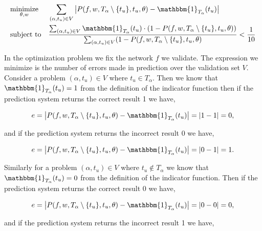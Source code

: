 \begin{equation}
    \label{eq:prediction_system_minimization}
    \begin{aligned}
        & \underset{\theta, w}{\text{minimize}}
        & & \sum_{(\alpha, t_u) \in V} \left|
            P(f, w, T_\alpha \setminus \{t_u\}, t_u, \theta) -
            \mathbbm{1}_{T_\alpha}(t_u)
        \right| \\
        & \text{subject to}
        & & \frac{\sum_{(\alpha, t_u) \in V} \mathbbm{1}_{T_\alpha}(t_u) \cdot
            \left(1 - P(f, w, T_\alpha \setminus \{t_u\}, t_u, \theta)\right)}
{\sum_{(\alpha, t_u) \in V} (1 - P(f, w, T_\alpha \setminus \{t_u\}, t_u, \theta)} <
            \frac{1}{10}
    \end{aligned}
\end{equation}

In the optimization problem we fix the network $f$ we validate. The expression
we minimize is the number of errors made in prediction over the validation set
$V$. Consider a problem $(\alpha, t_u) \in V$ where $t_u \in T_\alpha$. Then we
know that $\mathbbm{1}_{T_\alpha}(t_u) = 1$ from the definition of the indicator
function then if the prediction system returns the correct result 1 we have,

\begin{equation}
    e = \left|
        P(f, w, T_\alpha \setminus \{t_u\}, t_u, \theta) -
        \mathbbm{1}_{T_\alpha}(t_u)
    \right| = |1 - 1| = 0,
\end{equation}

and if the prediction system returns the incorrect result 0 we have,

\begin{equation}
    e = \left|
        P(f, w, T_\alpha \setminus \{t_u\}, t_u, \theta) -
        \mathbbm{1}_{T_\alpha}(t_u)
    \right| = |0 - 1| = 1.
\end{equation}

Similarly for a problem $(\alpha, t_u) \in V$ where $t_u \notin T_\alpha$ we
know that $\mathbbm{1}_{T_\alpha}(t_u) = 0$ from the definition of the indicator
function. Then if the prediction system returns the correct result 0 we have,

\begin{equation}
    e = \left|
        P(f, w, T_\alpha \setminus \{t_u\}, t_u, \theta) -
        \mathbbm{1}_{T_\alpha}(t_u)
    \right| = |0 - 0| = 0, \end{equation}

and if the prediction system returns the incorrect result 1 we have,

